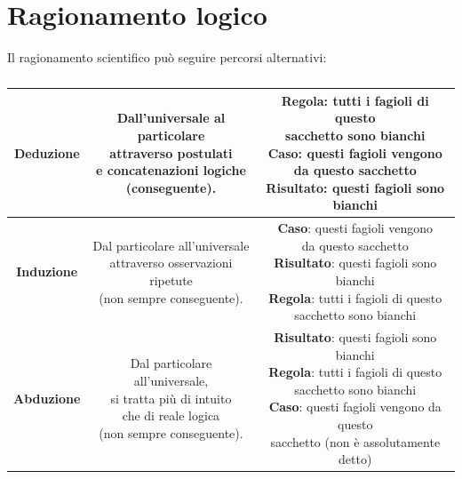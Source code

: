 \documentclass[10pt, draft]{book}
\begin{document}
\section{Ragionamento logico}
Il ragionamento scientifico può seguire percorsi alternativi:
\begin{table}[h]
    \centering
    \renewcommand\arraystretch{1.2}
    \begin{tabular}{ c|c|c }
    \hline
    \textbf{Deduzione} & \makecell[l]{Dall’universale al particolare\\ attraverso postulati\\ e concatenazioni logiche\\ (conseguente).} & \makecell[l]{\textbf{Regola}: tutti i fagioli di questo\\ sacchetto sono bianchi\\
    \textbf{Caso}: questi fagioli vengono\\ da questo sacchetto\\
    \textbf{Risultato}: questi fagioli sono bianchi}\\
    \hline
    \textbf{Induzione} & \makecell[l]{Dal particolare all’universale\\ attraverso osservazioni ripetute\\ (non sempre conseguente).} & \makecell[l]{\textbf{Caso}: questi fagioli vengono\\ da questo sacchetto\\
    \textbf{Risultato}: questi fagioli sono bianchi\\
    \textbf{Regola}: tutti i fagioli di questo\\ sacchetto sono bianchi}\\
    \hline
    \textbf{Abduzione} & \makecell[l]{Dal particolare all’universale,\\ si tratta più di intuito\\ che di reale logica\\ (non sempre conseguente).} & \makecell[l]{\textbf{Risultato}: questi fagioli sono bianchi\\
    \textbf{Regola}: tutti i fagioli di questo\\ sacchetto sono bianchi\\
    \textbf{Caso}: questi fagioli vengono da questo\\ sacchetto
(non è assolutamente detto)}\\
    \hline
    \end{tabular}
    \caption{}
    \label{tabragionamentologico}
\end{table}\noindent
\end{document}
